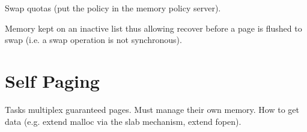 Swap quotas (put the policy in the memory policy server).

Memory kept on an inactive list thus allowing recover before a page is
flushed to swap (i.e. a swap operation is not synchronous).

\section{Self Paging}

Tasks multiplex guaranteed pages.  Must manage their own memory.  How
to get data (e.g. extend malloc via the slab mechanism, extend fopen).


% 
% 
% 
% 
